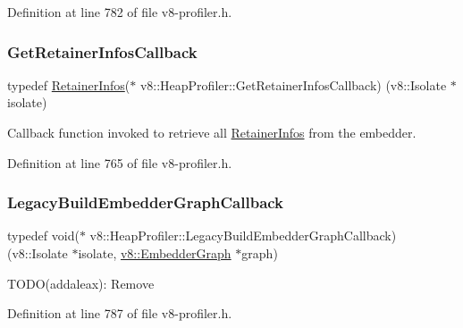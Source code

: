 Definition at line 782 of file v8-\/profiler.\+h.

\mbox{\label{classv8_1_1HeapProfiler_a7f34c8eb67f9502e5778695187ea0e96}} 
\subsubsection{\texorpdfstring{Get\+Retainer\+Infos\+Callback}{GetRetainerInfosCallback}}
{\footnotesize\ttfamily typedef \mbox{\hyperlink{structv8_1_1HeapProfiler_1_1RetainerInfos}{Retainer\+Infos}}($\ast$ v8\+::\+Heap\+Profiler\+::\+Get\+Retainer\+Infos\+Callback) (v8\+::\+Isolate $\ast$isolate)}

Callback function invoked to retrieve all \mbox{\hyperlink{structv8_1_1HeapProfiler_1_1RetainerInfos}{Retainer\+Infos}} from the embedder. 

Definition at line 765 of file v8-\/profiler.\+h.

\mbox{\label{classv8_1_1HeapProfiler_aafaa85413706329f7767f559b701eb1a}} 
\subsubsection{\texorpdfstring{Legacy\+Build\+Embedder\+Graph\+Callback}{LegacyBuildEmbedderGraphCallback}}
{\footnotesize\ttfamily typedef void($\ast$ v8\+::\+Heap\+Profiler\+::\+Legacy\+Build\+Embedder\+Graph\+Callback) (v8\+::\+Isolate $\ast$isolate, \mbox{\hyperlink{classv8_1_1EmbedderGraph}{v8\+::\+Embedder\+Graph}} $\ast$graph)}

T\+O\+D\+O(addaleax)\+: Remove 

Definition at line 787 of file v8-\/profiler.\+h.

\mbox{\label{classv8_1_1HeapProfiler_a677025dd201fd832e0464e5ab0b0d0d4}} 
